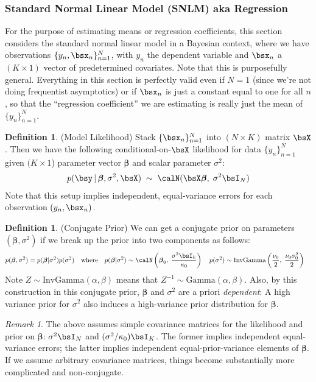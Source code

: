 \documentclass[12pt]{article}
\theoremstyle{plain}
\theoremstyle{definition}
\newtheorem{defn}[thm]{Definition}
\theoremstyle{remark}
\newtheorem*{rmk}{Remark}
\newcommand{\bsbeta}{\boldsymbol{\beta}}
\newcommand{\nN}{_{n=1}^N}
\begin{document}
\clearpage
\subsubsection{Standard Normal Linear Model (SNLM) aka Regression}

For the purpose of estimating means or regression coefficients, this
section considers the standard normal linear model in a Bayesian
context, where we have observations $\{y_n,\bsx_n\}\nN$, with $y_n$
the dependent variable and $\bsx_n$ a $(K\times 1)$ vector of
predetermined covariates.
Note that this is purposefully general. Everything in this section
is perfectly valid even if $N=1$ (since we're not doing frequentist
asymptotics) or if $\bsx_n$ is just a constant equal to one for all $n$,
so that the ``regression coefficient'' we are estimating is really just
the mean of $\{y_n\}\nN$.

\begin{defn}(Model Likelihood)
Stack $\{\bsx_n\}\nN$ into $(N\times K)$ matrix $\bsX$. Then we have the
following conditional-on-$\bsX$ likelihood for data $\{y_n\}\nN$ given
$(K\times 1$) parameter vector $\bsbeta$ and scalar parameter
$\sigma^2$:
\begin{align*}
  p(\bsy\,|\,\bsbeta,\sigma^2,\bsX)
  \;\sim\;\calN(\bsX\bsbeta,\;\sigma^2 \bsI_N)
\end{align*}
Note that this setup implies independent, equal-variance errors for each
observation $(y_n,\bsx_n)$.
\end{defn}

\begin{defn}(Conjugate Prior)
We can get a conjugate prior on parameters $(\bsbeta,\sigma^2)$ if we
break up the prior into two components as follows:
\begin{align*}
  p(\bsbeta,\sigma^2)
  =
  p(\bsbeta|\sigma^2)p(\sigma^2)
  \quad\text{where}\quad
  p(\bsbeta|\sigma^2)
  &\sim
  \calN\left(\bsbeta_0, \; \frac{\sigma^2\bsI_k}{\kappa_0}
  \right)
  \quad
  p(\sigma^2)
  \sim \text{InvGamma}\left(
  \frac{\nu_0}{2},
  \; \frac{\nu_0\sigma^2_0}{2}
  \right)
\end{align*}
Note $Z\sim \text{InvGamma}(\alpha,\beta)$ means that
$Z^{-1}\sim\text{Gamma}(\alpha,\beta)$.
Also, by this construction in this conjugate prior, $\bsbeta$ and
$\sigma^2$ are a priori \emph{dependent}: A high variance prior for
$\sigma^2$ also induces a high-variance prior distribution for
$\bsbeta$.
\end{defn}
\begin{rmk}
The above assumes simple covariance matrices for the likelihood and
prior on $\bsbeta$: $\sigma^2\bsI_N$ and $(\sigma^2/\kappa_0)\bsI_K$.
The former implies independent equal-variance errors; the latter implies
independent equal-prior-variance elements of $\bsbeta$.
If we assume arbitrary covariance matrices, things become substantially
more complicated and non-conjugate.
\end{rmk}
\end{document}

